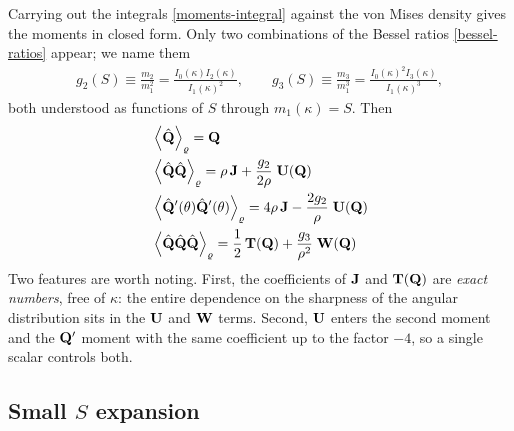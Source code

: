 \documentclass[a5paper]{article}
\begin{document}
Carrying out the integrals \eqref{moments-integral} against the von Mises density gives the moments in closed form. Only two combinations of the Bessel ratios \eqref{bessel-ratios} appear; we name them
\begin{align}
    \label{g-coefficients}
    g_2(S) \equiv \frac{m_2}{m_1^2} = \frac{I_0(\kappa)I_2(\kappa)}{I_1(\kappa)^2},
    \qquad
    g_3(S) \equiv \frac{m_3}{m_1^3} = \frac{I_0(\kappa)^2 I_3(\kappa)}{I_1(\kappa)^3},
\end{align}
both understood as functions of $S$ through $m_1(\kappa) = S$. Then
\begin{subequations}
    \label{exact-moments}
\begin{align}
    &\left\langle \hat{\mathbf{Q}} \right\rangle_\varrho = \mathbf{Q}
    \\
    &\left\langle \hat{\mathbf{Q}}\hat{\mathbf{Q}} \right\rangle_\varrho
    = \rho\,\mathbf{J} + \frac{g_2}{2\rho}\;\mathbf{U}(\mathbf{Q})
    \\
    &\left\langle \hat{\mathbf{Q}}'(\theta)\hat{\mathbf{Q}}'(\theta) \right\rangle_\varrho
    = 4\rho\,\mathbf{J} - \frac{2 g_2}{\rho}\;\mathbf{U}(\mathbf{Q})
    \\
    &\left\langle \hat{\mathbf{Q}}\hat{\mathbf{Q}}\hat{\mathbf{Q}} \right\rangle_\varrho
    = \frac{1}{2}\,\mathbf{T}(\mathbf{Q}) + \frac{g_3}{\rho^2}\;\mathbf{W}(\mathbf{Q})
\end{align}
\end{subequations}
Two features are worth noting. First, the coefficients of $\mathbf{J}$ and $\mathbf{T}(\mathbf{Q})$ are \emph{exact numbers}, free of $\kappa$: the entire dependence on the sharpness of the angular distribution sits in the $\mathbf{U}$ and $\mathbf{W}$ terms. Second, $\mathbf{U}$ enters the second moment and the $\mathbf{Q}'$ moment with the same coefficient up to the factor $-4$, so a single scalar controls both.

\subsection{Small \texorpdfstring{$S$}{S} expansion}
\label{sec-small-S}
\end{document}
